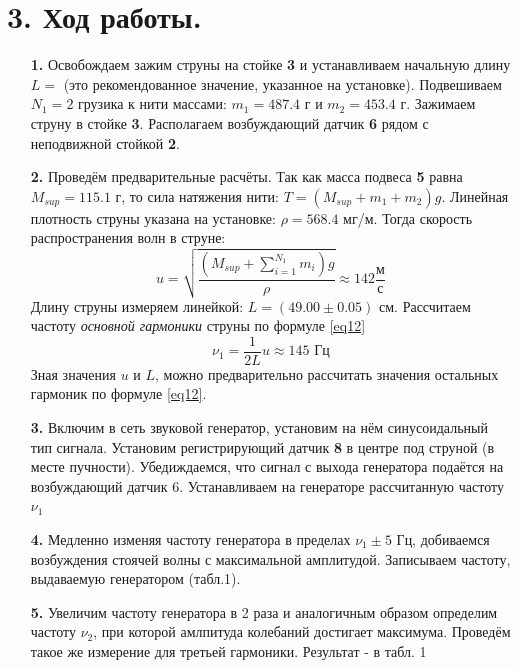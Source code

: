 \documentclass[a4paper]{article}
\begin{document}
\section*{3. Ход работы.}
\begin{itemize}
\item[\textbf{1. }] Освобождаем зажим струны на стойке \textbf{3} и устанавливаем начальную длину $L = $ (это рекомендованное значение, указанное на установке). Подвешиваем $N_1 = 2$ грузика к нити массами: $m_1 = 487.4$ г и $m_2 = 453.4$ г. Зажимаем струну в стойке \textbf{3}. Располагаем возбуждающий датчик \textbf{6} рядом с неподвижной стойкой \textbf{2}. 
\item[\textbf{2. }] Проведём предварительные расчёты.	Так как масса подвеса \textbf{5} равна $M_{sup} = 115.1$ г, то сила натяжения нити: $T = (M_{sup} + m_1+m_2)g$. Линейная плотность струны указана на установке: $\rho = 568.4$ мг/м. Тогда скорость распространения волн в струне:
\begin{equation}
u = \sqrt{\frac{\left(M_{sup} + \sum\limits_{i=1}^{N_1}m_i \right)g}{\rho}} \approx 142 \frac{\text{м}}{{\text{с}}}
\end{equation}
Длину струны измеряем линейкой: $L = (49.00 \pm 0.05)$ см. Рассчитаем частоту \textit{основной гармоники} струны по формуле \eqref{eq12}
\[\nu_1 = \frac{1}{2L} u \approx 145 \text{ Гц} \]
Зная значения $u$ и $L$, можно предварительно рассчитать значения остальных гармоник по формуле \eqref{eq12}.
\item[\textbf{3. }] Включим в сеть звуковой генератор, установим на нём синусоидальный тип сигнала. Установим регистрирующий датчик \textbf{8} в центре под струной (в месте пучности). Убедиждаемся, что сигнал с выхода генератора подаётся на возбуждающий датчик 6. Устанавливаем на генераторе рассчитанную частоту $\nu_1$
\item[\textbf{4. }] Медленно изменяя частоту генератора в пределах $\nu_1 \pm 5$ Гц, добиваемся возбуждения стоячей волны с максимальной амплитудой. Записываем частоту, выдаваемую генератором (табл.1).
\item[\textbf{5. }] Увеличим частоту генератора в 2 раза и аналогичным образом определим частоту $\nu_2$, при которой амлпитуда колебаний достигает максимума. Проведём такое же измерение для третьей гармоники. Результат - в табл. 1


\end{itemize}
\end{document}
